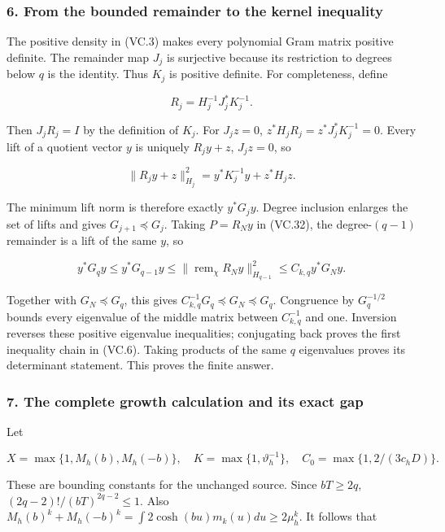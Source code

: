 \subsubsection{6. From the bounded remainder to the kernel inequality}\label{endpoint-volume_connection_original--from-the-bounded-remainder-to-the-kernel-inequality}

The positive density in (VC.3) makes every polynomial Gram matrix positive definite. The remainder map \(J_j\) is surjective because its restriction to degrees below \(q\) is the identity. Thus \(K_j\) is positive definite. For completeness, define

\[
 R_j=H_j^{-1}J_j^*K_j^{-1}.
\tag{VC.33}
\]

Then \(J_jR_j=I\) by the definition of \(K_j\). For \(J_jz=0\), \(z^*H_jR_j=z^*J_j^*K_j^{-1}=0\). Every lift of a quotient vector \(y\) is uniquely \(R_jy+z\), \(J_jz=0\), so

\[
 \|R_jy+z\|_{H_j}^2=y^*K_j^{-1}y+z^*H_jz.
\tag{VC.34}
\]

The minimum lift norm is therefore exactly \(y^*G_jy\). Degree inclusion enlarges the set of lifts and gives \(G_{j+1}\preceq G_j\). Taking \(P=R_Ny\) in (VC.32), the degree-\((q-1)\) remainder is a lift of the same \(y\), so

\[
 y^*G_qy\le y^*G_{q-1}y
 \le\|\operatorname{rem}_{\chi}R_Ny\|_{H_{q-1}}^2
 \le C_{k,q}y^*G_Ny.
\tag{VC.35}
\]

Together with \(G_N\preceq G_q\), this gives \(C_{k,q}^{-1}G_q\preceq G_N\preceq G_q\). Congruence by \(G_q^{-1/2}\) bounds every eigenvalue of the middle matrix between \(C_{k,q}^{-1}\) and one. Inversion reverses these positive eigenvalue inequalities; conjugating back proves the first inequality chain in (VC.6). Taking products of the same \(q\) eigenvalues proves its determinant statement. This proves the finite answer.

\subsubsection{7. The complete growth calculation and its exact gap}\label{endpoint-volume_connection_original--the-complete-growth-calculation-and-its-exact-gap}

Let

\[
 X=\max\{1,M_h(b),M_h(-b)\},\quad
 K=\max\{1,\vartheta_h^{-1}\},\quad
 C_0=\max\{1,2/(3c_hD)\}.
\tag{VC.36}
\]

These are bounding constants for the unchanged source. Since \(bT\ge2q\), \((2q-2)!/(bT)^{2q-2}\le1\). Also \(M_h(b)^k+M_h(-b)^k=\int 2\cosh(bu)m_k(u)du\ge2\mu_h^k\). It follows that

